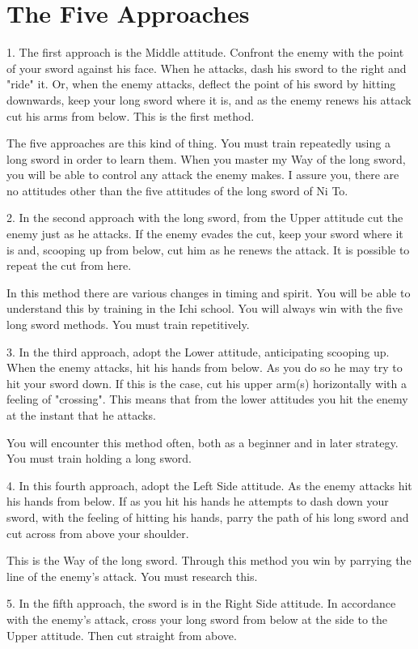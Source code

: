 \documentclass[12pt]{report}
\begin{document}
\section*{The Five Approaches}
1. The first approach is the Middle attitude. Confront the enemy with the point of your sword against his face. When he attacks, dash his sword to the right and "ride" it. Or, when the enemy attacks, deflect the point of his sword by hitting downwards, keep your long sword where it is, and as the enemy renews his attack cut his arms from below. This is the first method.

The five approaches are this kind of thing. You must train repeatedly using a long sword in order to learn them. When you master my Way of the long sword, you will be able to control any attack the enemy makes. I assure you, there are no attitudes other than the five attitudes of the long sword of Ni To.

2. In the second approach with the long sword, from the Upper attitude cut the enemy just as he attacks. If the enemy evades the cut, keep your sword where it is and, scooping up from below, cut him as he renews the attack. It is possible to repeat the cut from here.

In this method there are various changes in timing and spirit. You will be able to understand this by training in the Ichi school. You will always win with the five long sword methods. You must train repetitively.

3. In the third approach, adopt the Lower attitude, anticipating scooping up. When the enemy attacks, hit his hands from below. As you do so he may try to hit your sword down. If this is the case, cut his upper arm(s) horizontally with a feeling of "crossing". This means that from the lower attitudes you hit the enemy at the instant that he attacks.

You will encounter this method often, both as a beginner and in later strategy. You must train holding a long sword.

4. In this fourth approach, adopt the Left Side attitude. As the enemy attacks hit his hands from below. If as you hit his hands he attempts to dash down your sword, with the feeling of hitting his hands, parry the path of his long sword and cut across from above your shoulder.

This is the Way of the long sword. Through this method you win by parrying the line of the enemy's attack. You must research this.

5. In the fifth approach, the sword is in the Right Side attitude. In accordance with the enemy's attack, cross your long sword from below at the side to the Upper attitude. Then cut straight from above.
\end{document}
